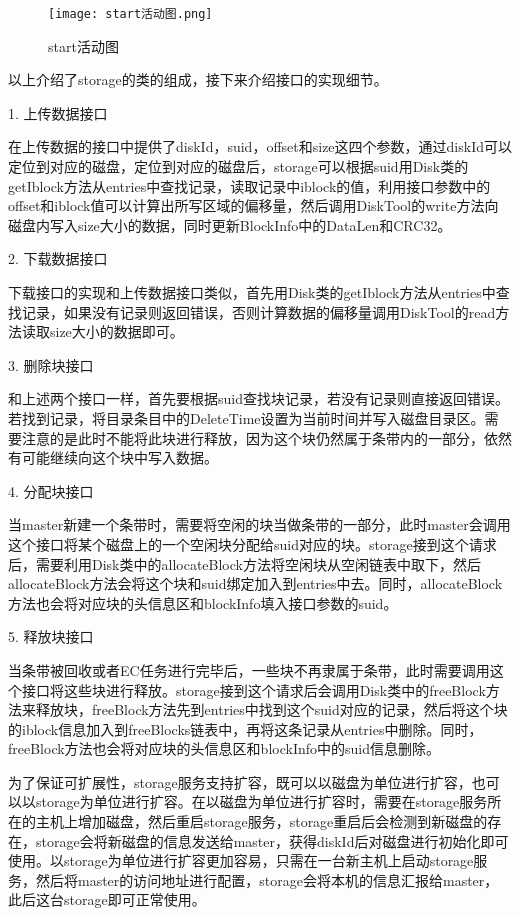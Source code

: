 \begin{figure}
  \centering
  \texttt{[image: start活动图.png]}
  \caption{start活动图}
\end{figure}

以上介绍了storage的类的组成，接下来介绍接口的实现细节。

1. 上传数据接口

在上传数据的接口中提供了diskId，suid，offset和size这四个参数，通过diskId可以定位到对应的磁盘，定位到对应的磁盘后，storage可以根据suid用Disk类的getIblock方法从entries中查找记录，读取记录中iblock的值，利用接口参数中的offset和iblock值可以计算出所写区域的偏移量，然后调用DiskTool的write方法向磁盘内写入size大小的数据，同时更新BlockInfo中的DataLen和CRC32。

2. 下载数据接口

下载接口的实现和上传数据接口类似，首先用Disk类的getIblock方法从entries中查找记录，如果没有记录则返回错误，否则计算数据的偏移量调用DiskTool的read方法读取size大小的数据即可。

3. 删除块接口

和上述两个接口一样，首先要根据suid查找块记录，若没有记录则直接返回错误。若找到记录，将目录条目中的DeleteTime设置为当前时间并写入磁盘目录区。需要注意的是此时不能将此块进行释放，因为这个块仍然属于条带内的一部分，依然有可能继续向这个块中写入数据。

4. 分配块接口

当master新建一个条带时，需要将空闲的块当做条带的一部分，此时master会调用这个接口将某个磁盘上的一个空闲块分配给suid对应的块。storage接到这个请求后，需要利用Disk类中的allocateBlock方法将空闲块从空闲链表中取下，然后allocateBlock方法会将这个块和suid绑定加入到entries中去。同时，allocateBlock方法也会将对应块的头信息区和blockInfo填入接口参数的suid。

5. 释放块接口

当条带被回收或者EC任务进行完毕后，一些块不再隶属于条带，此时需要调用这个接口将这些块进行释放。storage接到这个请求后会调用Disk类中的freeBlock方法来释放块，freeBlock方法先到entries中找到这个suid对应的记录，然后将这个块的iblock信息加入到freeBlocks链表中，再将这条记录从entries中删除。同时，freeBlock方法也会将对应块的头信息区和blockInfo中的suid信息删除。

为了保证可扩展性，storage服务支持扩容，既可以以磁盘为单位进行扩容，也可以以storage为单位进行扩容。在以磁盘为单位进行扩容时，需要在storage服务所在的主机上增加磁盘，然后重启storage服务，storage重启后会检测到新磁盘的存在，storage会将新磁盘的信息发送给master，获得diskId后对磁盘进行初始化即可使用。以storage为单位进行扩容更加容易，只需在一台新主机上启动storage服务，然后将master的访问地址进行配置，storage会将本机的信息汇报给master，此后这台storage即可正常使用。

